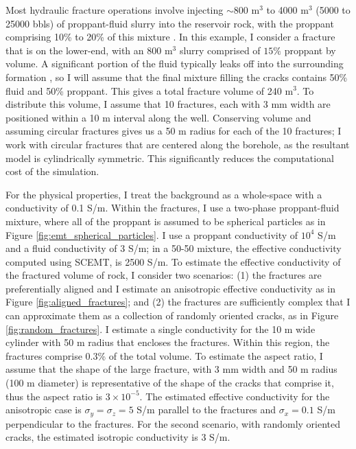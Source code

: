 Most hydraulic fracture operations involve injecting $\sim$800 m$^3$ to 4000 m$^3$ (5000 to 25000 bbls) of proppant-fluid slurry into the reservoir rock, with the proppant comprising 10\% to 20\% of this mixture \citep{Hoversten2015}. In this example, I consider a fracture that is on the lower-end, with an 800 m$^3$ slurry comprised of $15\%$ proppant by volume. A significant portion of the fluid typically leaks off into the surrounding formation \citep{Novotny1977}, so I will assume that the final mixture filling the cracks contains 50\% fluid and 50\% proppant. This gives a total fracture volume of 240 m$^3$. To distribute this volume, I assume that 10 fractures, each with 3 mm width are positioned within a 10 m interval along the well. Conserving volume and assuming circular fractures gives us a 50 m radius for each of the 10 fractures; I work with circular fractures that are centered along the borehole, as the resultant model is cylindrically symmetric. This significantly reduces the computational cost of the simulation.



For the physical properties, I treat the background as a whole-space with a conductivity of 0.1 S/m. Within the fractures, I use a two-phase proppant-fluid mixture, where all of the proppant is assumed to be spherical particles as in Figure \ref{fig:emt_spherical_particles}. I use a proppant conductivity of $10^4$ S/m and a fluid conductivity of 3 S/m; in a 50-50 mixture, the effective conductivity computed using SCEMT, is 2500 S/m. To estimate the effective conductivity of the fractured volume of rock, I consider two scenarios: (1) the fractures are preferentially aligned and I estimate an anisotropic effective conductivity as in Figure \ref{fig:aligned_fractures}; and (2) the fractures are sufficiently complex that I can approximate them as a collection of randomly oriented cracks, as in Figure \ref{fig:random_fractures}. I estimate a single conductivity for the 10 m wide cylinder with 50 m radius that encloses the fractures. Within this region, the fractures comprise 0.3\% of the total volume. To estimate the aspect ratio, I assume that the shape of the large fracture, with 3 mm width and 50 m radius (100 m diameter) is representative of the shape of the cracks that comprise it, thus the aspect ratio is $3\times10^{-5}$. The estimated effective conductivity for the anisotropic case is $\sigma_y = \sigma_z = 5$ S/m parallel to the fractures and $\sigma_x = 0.1$ S/m perpendicular to the fractures. For the second scenario, with randomly oriented cracks, the estimated isotropic conductivity is 3 S/m.

